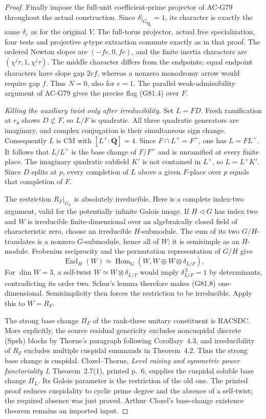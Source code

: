 \begin{proof}
Finally impose the full-unit coefficient-prime projector of
AC-G79 throughout the actual construction.
Since \(\delta|_{G_{\mathbf Q_p}}=1\), its character is exactly
the same \(\delta_e\) as for the original \(V\).
The full-torus projector, actual free specialization, four
tests and projective \(q\)-type extraction commute exactly
as in that proof.  The ordered Newton slopes are
\((-fe,0,fe)\), and the finite inertia characters are
\((\chi^j\tau,1,\chi^j\tau)\).
The middle character differs from the endpoints; equal
endpoint characters have slope gap \(2ef\), whereas a
nonzero monodromy arrow would require gap \(f\).
Thus \(N=0\), also for \(e=1\).
The parallel weak-admissibility argument of AC-G79 gives
the precise flag (G81.4) over \(F\).

\emph{Killing the auxiliary twist only after irreducibility.}
Set \(L=FD\).  Fresh ramification at \(r_0\) shows \(D\not\subset F\),
so \(L/F\) is quadratic.
All three quadratic generators are imaginary, and complex
conjugation is their simultaneous sign change.
Consequently \(L\) is CM with \([L^+:\mathbf Q]=4\).
Since \(F\cap L^+=F^+\), one has \(L=FL^+\).
It follows that \(L/L^+\) is the base change of \(F/F^+\)
and is unramified at every finite place.
The imaginary quadratic subfield \(K'\) is not contained in
\(L^+\), so \(L=L^+K'\).
Since \(D\) splits at \(p\), every completion of \(L\) above a
given \(F\)-place over \(p\) equals that completion of \(F\).

The restriction \(R_F|_{G_L}\) is absolutely irreducible.
Here is a complete index-two argument, valid for the
potentially infinite Galois image.
If \(H\triangleleft G\) has index two and \(W\) is irreducible
finite-dimensional over an algebraically closed field of
characteristic zero, choose an irreducible \(H\)-submodule.
The sum of its two \(G/H\)-translates is a nonzero
\(G\)-submodule, hence all of \(W\); it is semisimple as an
\(H\)-module.  Frobenius reciprocity and the permutation
representation of \(G/H\) give
\[
 \operatorname{End}_{H}(W)
   \simeq
 \operatorname{Hom}_{G}(W,W\oplus W\otimes\delta_{L/F}).
                                                        \tag{G81.8}
\]
For \(\dim W=3\), a self-twist
\(W\simeq W\otimes\delta_{L/F}\) would imply
\(\delta_{L/F}^{\,3}=1\) by determinants, contradicting its
order two.  Schur's lemma therefore makes (G81.8)
one-dimensional.  Semisimplicity then forces the restriction
to be irreducible.  Apply this to \(W=R_F\).

The strong base change \(\Pi_F\) of the rank-three unitary
constituent is RACSDC.  More explicitly, the source residual
genericity excludes noncuspidal discrete (Speh) blocks by
Thorne's paragraph following Corollary~4.3, and irreducibility
of \(R_F\) excludes multiple cuspidal summands in Theorem~4.2.
Thus the strong base change is cuspidal.
Clozel--Thorne, \emph{Level raising and symmetric power
functoriality I}, Theorem~2.7(1), printed p.~6, supplies the
cuspidal soluble base change \(\Pi_L\).
Its Galois parameter is the restriction of the old one.
The printed proof reduces cuspidality to cyclic prime
degree and the absence of a self-twist; the required
absence was just proved.  Arthur--Clozel's base-change
existence theorem remains an imported input.


\end{proof}
